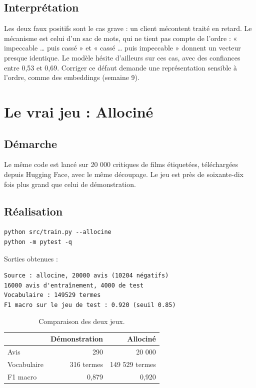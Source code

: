 \documentclass[11pt,a4paper]{article}
\begin{document}
\subsection{Interprétation}

Les deux faux positifs sont le cas grave : un client mécontent traité en retard. Le mécanisme est celui d'un sac de mots, qui ne tient pas compte de l'ordre : « impeccable … puis cassé » et « cassé … puis impeccable » donnent un vecteur presque identique. Le modèle hésite d'ailleurs sur ces cas, avec des confiances entre 0,53 et 0,69. Corriger ce défaut demande une représentation sensible à l'ordre, comme des embeddings (semaine 9).

\section{Le vrai jeu : Allociné}

\subsection{Démarche}

Le même code est lancé sur 20 000 critiques de films étiquetées, téléchargées depuis Hugging Face, avec le même découpage. Le jeu est près de soixante-dix fois plus grand que celui de démonstration.

\subsection{Réalisation}

\begin{verbatim}
python src/train.py --allocine
python -m pytest -q
\end{verbatim}

Sorties obtenues :
\begin{verbatim}
Source : allocine, 20000 avis (10204 négatifs)
16000 avis d'entraînement, 4000 de test
Vocabulaire : 149529 termes
F1 macro sur le jeu de test : 0.920 (seuil 0.85)
\end{verbatim}

\begin{table}[H]
\centering
\begin{tabular}{lrr}
\toprule
 & \textbf{Démonstration} & \textbf{Allociné} \\
\midrule
Avis & 290 & 20 000 \\
Vocabulaire & 316 termes & 149 529 termes \\
F1 macro & 0,879 & 0,920 \\
\bottomrule
\end{tabular}
\caption{Comparaison des deux jeux.}
\end{table}
\end{document}

